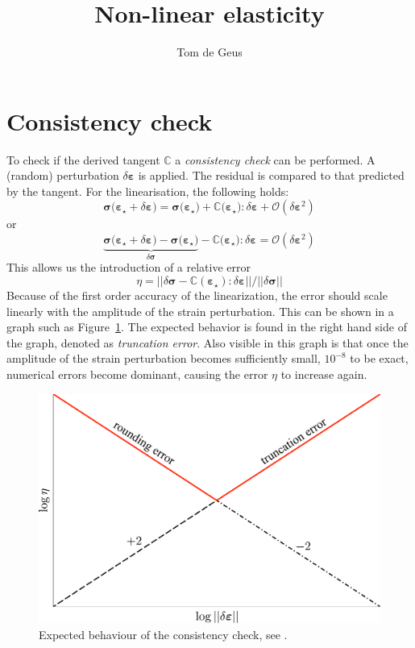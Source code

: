 \documentclass[garamond]{goose-article}
\title{Non-linear elasticity}
\author[1]{Tom de Geus}
\begin{document}
\maketitle



\section{Consistency check}

To check if the derived tangent $\mathbb{C}$ a \emph{consistency check} can be performed. A (random) perturbation $\delta \bm{\varepsilon}$ is applied. The residual is compared to that predicted by the tangent. For the linearisation, the following holds:
%
\begin{equation}
  \bm{\sigma}\big( \bm{\varepsilon}_\star + \delta \bm{\varepsilon} \big) =
  \bm{\sigma}\big( \bm{\varepsilon}_\star \big) +
  \mathbb{C} \big( \bm{\varepsilon}_\star \big) : \delta \bm{\varepsilon} +
  \mathcal{O}(\delta \bm{\varepsilon}^2)
\end{equation}
%
or
%
\begin{equation}
  \underbrace{
    \bm{\sigma}\big( \bm{\varepsilon}_\star + \delta \bm{\varepsilon} \big) -
    \bm{\sigma}\big( \bm{\varepsilon}_\star \big)
  }_{
    \displaystyle \delta \bm{\sigma}
  } -
  \mathbb{C} \big( \bm{\varepsilon}_\star \big) : \delta \bm{\varepsilon} =
  \mathcal{O}(\delta \bm{\varepsilon}^2)
\end{equation}
%
This allows us the introduction of a relative error
%
\begin{equation}
  \eta =
  \Big|\Big|
    \delta \bm{\sigma} -
    \mathbb{C}(\bm{\varepsilon}_\star) : \delta \bm{\varepsilon}
  \Big|\Big|
  /
  \Big|\Big| \delta \bm{\sigma} \Big|\Big|
\end{equation}
%
Because of the first order accuracy of the linearization, the error should scale linearly with the amplitude of the strain perturbation. This can be shown in a graph such as Figure~\ref{fig:newton:consistency}. The expected behavior is found in the right hand side of the graph, denoted as \textit{truncation error}. Also visible in this graph is that once the amplitude of the strain perturbation becomes sufficiently small, $10^{-8}$ to be exact, numerical errors become dominant, causing the error $\eta$ to increase again.

\begin{figure}[htp]
  \centering
  \includegraphics[width=.5\textwidth]{figures/consistency}
  \caption{Expected behaviour of the consistency check, see \citet[p.~9]{Heath2002}.}
  \label{fig:newton:consistency}
\end{figure}


\end{document}
